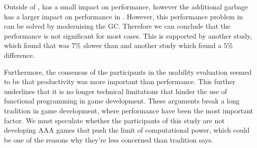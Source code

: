 Outside of \unity, \fs has a small impact on performance, however the additional garbage has a larger impact on performance in \unity. However, this performance problem in \unity can be solved by modernising the \gls{GC}. Therefore we can conclude that the performance is not significant for most cases. This is supported by another study, which found that \fs was 7\% slower than \cs\cite{bolhuis2019gameplay} and another study which found a 5\% difference\cite{maggiore2012formal}. 

Furthermore, the consensus of the participants in the usability evaluation seemed to be that productivity was more important than performance. This further underlines that it is no longer technical limitations that hinder the use of functional programming in game development. These arguments break a long tradition in game development, where performance have been the most important factor. We must speculate whether the participants of this study are not developing AAA games that push the limit of computational power, which could be one of the reasons why they're less concerned than tradition says.
